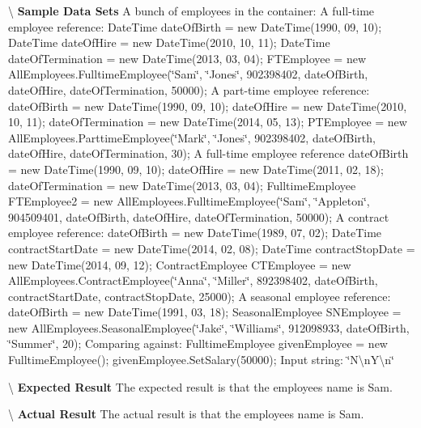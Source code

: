 \textbackslash{} {\bfseries  Sample Data Sets} A bunch of employees in the container\+: A full-\/time employee reference\+: Date\+Time date\+Of\+Birth = new Date\+Time(1990, 09, 10); Date\+Time date\+Of\+Hire = new Date\+Time(2010, 10, 11); Date\+Time date\+Of\+Termination = new Date\+Time(2013, 03, 04); F\+T\+Employee = new All\+Employees.\+Fulltime\+Employee(\char`\"{}\+Sam\char`\"{}, \char`\"{}\+Jones\char`\"{}, 902398402, date\+Of\+Birth, date\+Of\+Hire, date\+Of\+Termination, 50000); A part-\/time employee reference\+: date\+Of\+Birth = new Date\+Time(1990, 09, 10); date\+Of\+Hire = new Date\+Time(2010, 10, 11); date\+Of\+Termination = new Date\+Time(2014, 05, 13); P\+T\+Employee = new All\+Employees.\+Parttime\+Employee(\char`\"{}\+Mark\char`\"{}, \char`\"{}\+Jones\char`\"{}, 902398402, date\+Of\+Birth, date\+Of\+Hire, date\+Of\+Termination, 30); A full-\/time employee reference date\+Of\+Birth = new Date\+Time(1990, 09, 10); date\+Of\+Hire = new Date\+Time(2011, 02, 18); date\+Of\+Termination = new Date\+Time(2013, 03, 04); Fulltime\+Employee F\+T\+Employee2 = new All\+Employees.\+Fulltime\+Employee(\char`\"{}\+Sam\char`\"{}, \char`\"{}\+Appleton\char`\"{}, 904509401, date\+Of\+Birth, date\+Of\+Hire, date\+Of\+Termination, 50000); A contract employee reference\+: date\+Of\+Birth = new Date\+Time(1989, 07, 02); Date\+Time contract\+Start\+Date = new Date\+Time(2014, 02, 08); Date\+Time contract\+Stop\+Date = new Date\+Time(2014, 09, 12); Contract\+Employee C\+T\+Employee = new All\+Employees.\+Contract\+Employee(\char`\"{}\+Anna\char`\"{}, \char`\"{}\+Miller\char`\"{}, 892398402, date\+Of\+Birth, contract\+Start\+Date, contract\+Stop\+Date, 25000); A seasonal employee reference\+: date\+Of\+Birth = new Date\+Time(1991, 03, 18); Seasonal\+Employee S\+N\+Employee = new All\+Employees.\+Seasonal\+Employee(\char`\"{}\+Jake\char`\"{}, \char`\"{}\+Williams\char`\"{}, 912098933, date\+Of\+Birth, \char`\"{}\+Summer\char`\"{}, 20); Comparing against\+: Fulltime\+Employee given\+Employee = new Fulltime\+Employee(); given\+Employee.\+Set\+Salary(50000); Input string\+: \char`\"{}\+N\textbackslash{}n\+Y\textbackslash{}n\char`\"{}

\textbackslash{} {\bfseries  Expected Result} The expected result is that the employee\textquotesingle{}s name is Sam.

\textbackslash{} {\bfseries  Actual Result} The actual result is that the employee\textquotesingle{}s name is Sam. \hypertarget{class_the_company_1_1_tests_1_1_select_employee_tests_a49aa7f771fba78a5deccefe9c8f441c5}{}
